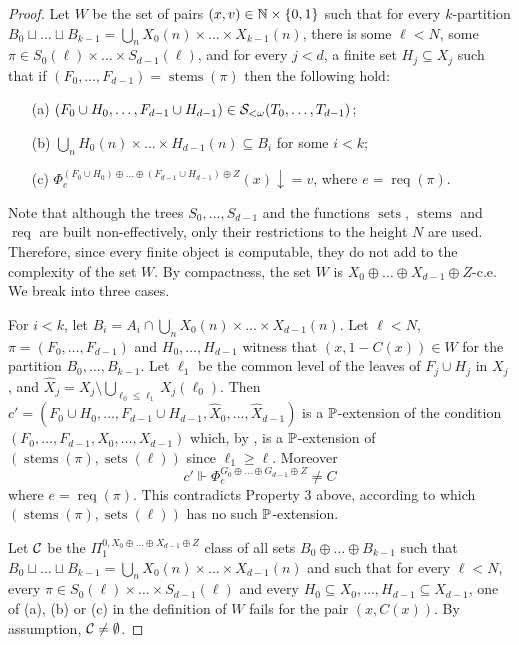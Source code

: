 \begin{proof}
Let $W$ be the set of pairs $(x, v) \in \mathbb{N} \times \{0,1\}$ such that for every $k$-partition $B_0 \sqcup \dots \sqcup B_{k-1} = \bigcup_n X_0(n) \times \dots \times X_{k-1}(n)$, there is some $\ell < N$, some $\pi \in S_0(\ell) \times \dots \times S_{d-1}(\ell)$, and for every $j < d$, a finite set $H_j \subseteq X_j$ such that if $ (F_0, \dots, F_{d-1}) = \operatorname{stems}(\pi)$ then the following hold:
\begin{itemize}
	\item[(a)] $(F_0 \cup H_0, \dots, F_{d-1} \cup H_{d-1}) \in \mathcal{S}_{<\omega}({T_0, \dots, T_{d-1}})$;
	\item[(b)] $\bigcup_n H_0(n) \times \dots \times H_{d-1}(n) \subseteq B_i$ for some $i < k$;
	\item[(c)] $\Phi_e^{(F_0 \cup H_0) \oplus \dots \oplus (F_{d-1} \cup H_{d-1}) \oplus Z}(x)\downarrow = v$, where $e = \operatorname{req}(\pi)$.
\end{itemize}
Note that although the trees $S_0, \dots, S_{d-1}$ and the functions $\operatorname{sets}$, $\operatorname{stems}$ and $\operatorname{req}$ are built non-effectively, only their restrictions to the height $N$ are used. Therefore, since every finite object is computable, they do not add to the complexity of the set $W$. By compactness, the set $W$ is $X_0 \oplus \dots \oplus X_{d-1} \oplus Z$-c.e. We break into three cases.


 For $i < k$, let $B_i = A_i \cap \bigcup_n X_0(n) \times \dots \times X_{d-1}(n)$. Let $\ell<N$, $\pi = (F_0, \dots, F_{d-1})$ and $H_0, \dots, H_{d-1}$ witness that $(x, 1-C(x)) \in W$ for the partition    $B_0, \dots, B_{k-1}$.
	Let $\ell_1$ be the common level of the leaves of $F_j \cup H_j$ in $X_j$, and $\hat{X}_j = X_j \setminus \bigcup_{\ell_0 \leq \ell_1} X_j(\ell_0)$. Then $c' = (F_0 \cup H_0, \dots, F_{d-1} \cup H_{d-1}, \hat{X}_0, \dots, \hat{X}_{d-1})$ is a $\mathbb{P}$-extension of the condition $(F_0, \dots, F_{d-1}, X_0, \dots, X_{d-1})$ which, by ,
		is a $\mathbb{P}$-extension of $(\operatorname{stems}(\pi), \operatorname{sets}(\ell))$ since $\ell_1 \geq \ell$.
		Moreover
		$$
			c' \Vdash \Phi_e^{G_0 \oplus \dots \oplus G_{d-1} \oplus Z} \neq C
		$$
		where $e = \operatorname{req}(\pi)$. This contradicts Property 3 above,
		according to which $(\operatorname{stems}(\pi), \operatorname{sets}(\ell))$ has no such $\mathbb{P}$-extension.

 Let $\mathcal{C}$ be the $\Pi^{0,X_0 \oplus \dots \oplus X_{d-1} \oplus Z}_1$ class of all sets $B_0 \oplus \dots \oplus B_{k-1}$ such that $B_0 \sqcup \dots \sqcup B_{k-1} = \bigcup_n X_0(n) \times \dots \times X_{d-1}(n)$ and such that for every $\ell < N$, every $\pi \in S_0(\ell) \times \dots \times S_{d-1}(\ell)$ and every $H_0 \subseteq X_0, \dots, H_{d-1} \subseteq X_{d-1}$, one of (a), (b) or (c) in the definition of $W$ fails for the pair $(x, C(x))$.
	By assumption, $\mathcal{C} \neq \emptyset$.


\end{proof}
